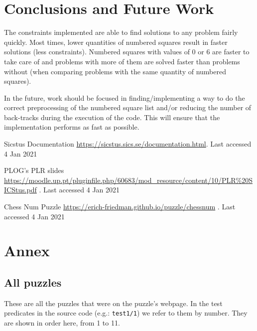 \documentclass[runningheads]{llncs}
\newcommand{\inlinecode}[1]{\texttt{#1}}
\begin{document}
\section{Conclusions and Future Work}
The constraints implemented are able to find solutions to any problem fairly
quickly. Most times, lower quantities of numbered squares result in faster
solutions (less constraints). Numbered squares with values of 0 or 6 are
faster to take care of and problems with more of them are solved faster than
problems without (when comparing problems with the same quantity of numbered squares).

In the future, work should be focused in finding/implementing a way to do the
correct preprocessing of the numbered square list and/or reducing the number
of back-tracks during the execution of the code. This will ensure that the
implementation performs as fast as possible.

\begin{thebibliography}{8}
    Sicstus Documentation
        \href{https://sicstus.sics.se/documentation.html}{https://sicstus.sics.se/documentation.html}.
        Last accessed 4 Jan 2021

    PLOG's PLR slides 
    \href{https://moodle.up.pt/pluginfile.php/60683/mod\_resource/content/10/PLR\%20SICStus.pdf}{https://moodle.up.pt/pluginfile.php/60683/mod\_resource/content/10/PLR\%20SICStus.pdf}
    . Last accessed 4 Jan 2021

    Chess Num Puzzle 
    \href{https://erich-friedman.github.io/puzzle/chessnum}{https://erich-friedman.github.io/puzzle/chessnum}
    . Last accessed 4 Jan 2021
\end{thebibliography}

\section{Annex}
\subsection{All puzzles}
These are all the puzzles that were on the puzzle's webpage. In the test predicates in
the source code (e.g.: \inlinecode{test1/1}) we refer to them by number. They are shown
in order here, from 1 to 11.
\end{document}
